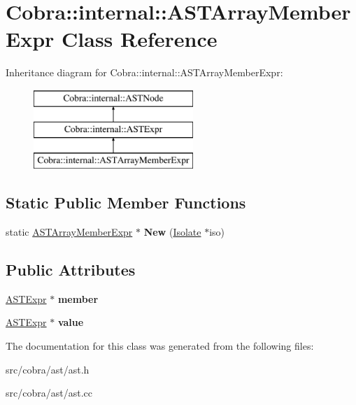 \hypertarget{class_cobra_1_1internal_1_1_a_s_t_array_member_expr}{\section{Cobra\+:\+:internal\+:\+:A\+S\+T\+Array\+Member\+Expr Class Reference}
\label{class_cobra_1_1internal_1_1_a_s_t_array_member_expr}
}
Inheritance diagram for Cobra\+:\+:internal\+:\+:A\+S\+T\+Array\+Member\+Expr\+:\begin{figure}[H]
\begin{center}
\leavevmode
\includegraphics[height=3.000000cm]{class_cobra_1_1internal_1_1_a_s_t_array_member_expr}
\end{center}
\end{figure}
\subsection*{Static Public Member Functions}
\begin{DoxyCompactItemize}
\item 
\hypertarget{class_cobra_1_1internal_1_1_a_s_t_array_member_expr_a52ab6d02f72230dd59234ede5ff9492b}{static \hyperlink{class_cobra_1_1internal_1_1_a_s_t_array_member_expr}{A\+S\+T\+Array\+Member\+Expr} $\ast$ {\bfseries New} (\hyperlink{class_cobra_1_1internal_1_1_isolate}{Isolate} $\ast$iso)}\label{class_cobra_1_1internal_1_1_a_s_t_array_member_expr_a52ab6d02f72230dd59234ede5ff9492b}

\end{DoxyCompactItemize}
\subsection*{Public Attributes}
\begin{DoxyCompactItemize}
\item 
\hypertarget{class_cobra_1_1internal_1_1_a_s_t_array_member_expr_a922f6f629046bbc5bdf5b6cc7995855a}{\hyperlink{class_cobra_1_1internal_1_1_a_s_t_expr}{A\+S\+T\+Expr} $\ast$ {\bfseries member}}\label{class_cobra_1_1internal_1_1_a_s_t_array_member_expr_a922f6f629046bbc5bdf5b6cc7995855a}

\item 
\hypertarget{class_cobra_1_1internal_1_1_a_s_t_array_member_expr_a082fbdf58b2a807931a81fda004b86f7}{\hyperlink{class_cobra_1_1internal_1_1_a_s_t_expr}{A\+S\+T\+Expr} $\ast$ {\bfseries value}}\label{class_cobra_1_1internal_1_1_a_s_t_array_member_expr_a082fbdf58b2a807931a81fda004b86f7}

\end{DoxyCompactItemize}


The documentation for this class was generated from the following files\+:\begin{DoxyCompactItemize}
\item 
src/cobra/ast/ast.\+h\item 
src/cobra/ast/ast.\+cc\end{DoxyCompactItemize}
